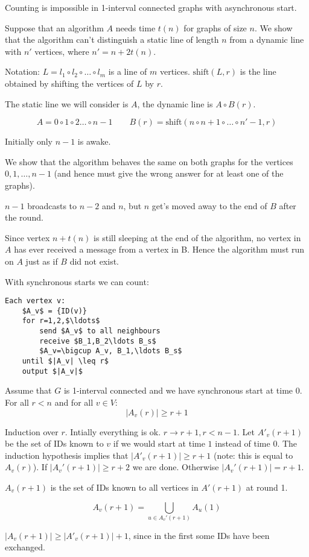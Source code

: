 \begin{thm} Counting is impossible in 1-interval connected graphs with asynchronous start.\end{thm}
\begin{pr} Suppose that an algorithm $A$ needs time $t(n)$ for graphs of size $n$. We show that the algorithm can't distinguish a static line of length $n$ from a dynamic line with $n'$ vertices, where $n'=n+2t(n)$.

Notation: $L=l_1\circ l_2\circ \ldots \circ l_m$ is a line of $m$ vertices. $\text{shift}(L,r)$ is the line obtained by shifting the vertices of $L$ by $r$.

The static line we will consider is $A$, the dynamic line is $A\circ B(r)$.

\[A = 0\circ 1 \circ 2\ldots \circ n-1 \qquad B(r) = \text{shift}(n\circ n+1\circ \ldots \circ n'-1,r)\]

Initially only $n-1$ is awake.

We show that the algorithm behaves the same on both graphs for the vertices $0,1,\ldots ,n-1$ (and hence must give the wrong answer for at least one of the graphs).


$n-1$ broadcasts to $n-2$ and $n$, but $n$ get's moved away to the end of $B$ after the round.

Since vertex $n+t(n)$ is still sleeping at the end of the algorithm, no vertex in $A$ has ever received a message from a vertex in B. Hence the algorithm must run on $A$ just as if $B$ did not exist.
\end{pr}

With synchronous starts we can count:

\begin{lstlisting}
Each vertex v:
	$A_v$ = {ID(v)}
	for r=1,2,$\ldots$
		send $A_v$ to all neighbours
		receive $B_1,B_2\ldots B_s$
		$A_v=\bigcup A_v, B_1,\ldots B_s$
	until $|A_v| \leq r$
	output $|A_v|$
\end{lstlisting}

\begin{lem} Assume that $G$ is 1-interval connected and we have synchronous start at time $0$. For all $r<n$ and for all $v\in V$:
\[|A_v(r)| \geq r+1\]
\end{lem}

\begin{pr} Induction over $r$. Intially everything is ok. $r\rightarrow r+1, r<n-1$. Let $A'_v(r+1)$ be the set of IDs known to $v$ if we would start at time $1$ instead of time 0. The induction hypothesis implies that $|A'_v(r+1)|\geq r+1$ (note: this is equal to $A_v(r)$). If $|A_v'(r+1)|\geq r+2$ we are done. Otherwise $|A_v'(r+1)|=r+1$. 

$A_v(r+1)$ is the set of IDs known to all vertices in $A'(r+1)$ at round 1.

\[A_v(r+1)=\bigcup_{u\in A_v'(r+1)} A_u(1)\]

$|A_v(r+1)|\geq |A'_v(r+1)|+1$, since in the first some IDs have been exchanged.
\end{pr}

